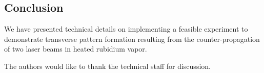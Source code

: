 \documentclass[aps,twocolumn,secnumarabic,balancelastpage,amsmath,amssymb,nofootinbib]{revtex4}
\begin{document}
\subsection*{Conclusion}
We have presented technical details on implementing a feasible experiment to demonstrate transverse pattern formation resulting from the counter-propagation of two laser beams in heated rubidium vapor.



\begin{acknowledgments} 
The authors would like to thank the technical staff for discussion.
\end{acknowledgments}

\clearpage
\appendix
\end{document}
